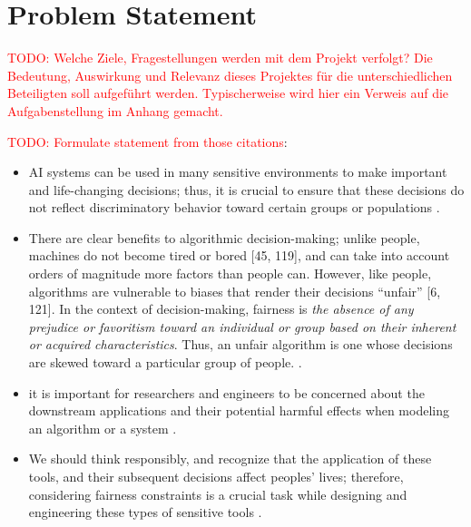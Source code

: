 \documentclass[12pt, a4paper, oneside]{book}   	%
\renewcommand{\todo}[1]{\textcolor{red}{TODO: #1}}
\begin{document}
	\listoffigures
	\listoftables
	\printnoidxglossaries
	
	
	
	\mainmatter
	
	
	\chapter{Problem Statement}
		\todo{Welche Ziele, Fragestellungen werden mit dem Projekt verfolgt? Die Bedeutung, Auswirkung und Relevanz dieses Projektes für die unterschiedlichen Beteiligten soll aufgeführt werden. Typischerweise wird hier ein Verweis auf die Aufgabenstellung im Anhang gemacht.}
	
		\todo{Formulate statement from those citations}:
		\begin{itemize}
			\item AI systems can be used in many sensitive environments to make important and life-changing decisions; thus, it is crucial to ensure that these decisions do not reflect discriminatory behavior toward certain groups or populations \autocite{Mehrabi_2021}.
			\item There are clear benefits to algorithmic decision-making; unlike people, machines do not become tired or bored [45, 119], and can take into account orders of magnitude more factors than people can. However, like people, algorithms are vulnerable to biases that render their decisions “unfair” [6, 121]. In the context of decision-making, fairness is \textit{the absence of any prejudice or favoritism toward an individual or group based on their inherent or acquired characteristics}. Thus, an unfair algorithm is one whose decisions are skewed toward a particular group of people. \autocite{Mehrabi_2021}.
			\item it is important for researchers and engineers to be concerned about the downstream applications and their potential harmful effects when modeling an algorithm or a system \autocite{Mehrabi_2021}.
			\item We should think responsibly, and recognize that the application of these tools, and their subsequent decisions affect peoples’ lives; therefore, considering fairness constraints is a crucial task while designing and engineering these types of sensitive tools \autocite{Mehrabi_2021}.
		\end{itemize}
	
\end{document}
